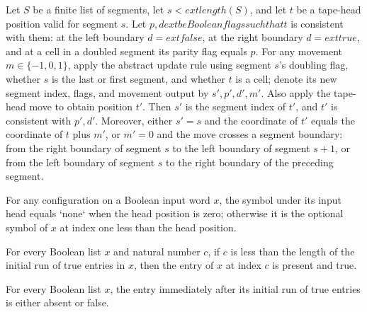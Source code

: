 \begin{lemma}
\label{Complexity.LogProg.gstep_tmove}
\leanok
{}
Let $S$ be a finite list of segments, let $s<	ext{length}(S)$, and let $t$ be a
tape-head position valid for segment $s$. Let $p,d	ext{ be Boolean flags such that }t$
is consistent with them: at the left boundary $d=	ext{false}$, at the right boundary
$d=	ext{true}$, and at a cell in a doubled segment its parity flag equals $p$. For any
movement $m\in\{-1,0,1\}$, apply the abstract update rule using segment $s$'s doubling
flag, whether $s$ is the last or first segment, and whether $t$ is a cell; denote its
new segment index, flags, and movement output by $s',p',d',m'$. Also apply the tape-head
move to obtain position $t'$. Then $s'$ is the segment index of $t'$, and $t'$ is
consistent with $p',d'$. Moreover, either $s'=s$ and the coordinate of $t'$ equals the
coordinate of $t$ plus $m'$, or $m'=0$ and the move crosses a segment boundary: from the
right boundary of segment $s$ to the left boundary of segment $s+1$, or from the left
boundary of segment $s$ to the right boundary of the preceding segment.
\end{lemma}

\begin{lemma}
\label{Complexity.LogProg.inputSymbol_eq}
\leanok
{}
For any configuration on a Boolean input word $x$, the symbol under its input head
equals `none` when the head position is zero; otherwise it is the optional symbol of $x$
at index one less than the head position.
\end{lemma}

\begin{lemma}
\leanok
{}
For every Boolean list $x$ and natural number $c$, if $c$ is less than the length of the
initial run of true entries in $x$, then the entry of $x$ at index $c$ is present and
true.
\end{lemma}

\begin{lemma}
\label{Complexity.LogProg.takeWhile_true_end}
\leanok
{}
For every Boolean list $x$, the entry immediately after its initial run of true entries
is either absent or false.
\end{lemma}

